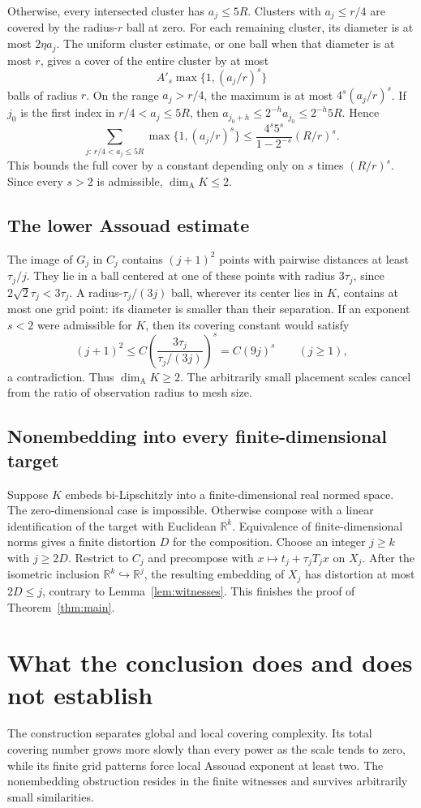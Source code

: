 \documentclass[11pt]{article}
\theoremstyle{remark}
\newcommand{\R}{\mathbb R}
\newcommand{\dimA}{\dim_{\mathrm A}}
\begin{document}
Otherwise, every intersected cluster has $a_j\le5R$. Clusters with $a_j\le r/4$ are covered by the radius-$r$ ball at zero. For each remaining cluster, its diameter is at most $2\eta a_j$. The uniform cluster estimate, or one ball when that diameter is at most $r$, gives a cover of the entire cluster by at most
\[
 A'_s\max\{1,(a_j/r)^s\}
\]
balls of radius $r$. On the range $a_j>r/4$, the maximum is at most $4^s(a_j/r)^s$. If $j_0$ is the first index in $r/4<a_j\le5R$, then $a_{j_0+h}\le2^{-h}a_{j_0}\le2^{-h}5R$. Hence
\[
 \sum_{j:\,r/4<a_j\le5R}\max\{1,(a_j/r)^s\}
 \le\frac{4^s5^s}{1-2^{-s}}(R/r)^s.
\]
This bounds the full cover by a constant depending only on $s$ times $(R/r)^s$. Since every $s>2$ is admissible, $\dimA K\le2$.

\subsection{The lower Assouad estimate}
The image of $G_j$ in $C_j$ contains $(j+1)^2$ points with pairwise distances at least $\tau_j/j$. They lie in a ball centered at one of these points with radius $3\tau_j$, since $2\sqrt2\tau_j<3\tau_j$. A radius-$\tau_j/(3j)$ ball, wherever its center lies in $K$, contains at most one grid point: its diameter is smaller than their separation. If an exponent $s<2$ were admissible for $K$, then its covering constant would satisfy
\[
 (j+1)^2\le C\left(\frac{3\tau_j}{\tau_j/(3j)}\right)^s
 =C(9j)^s\qquad(j\ge1),
\]
a contradiction. Thus $\dimA K\ge2$. The arbitrarily small placement scales cancel from the ratio of observation radius to mesh size.

\subsection{Nonembedding into every finite-dimensional target}
Suppose $K$ embeds bi-Lipschitzly into a finite-dimensional real normed space. The zero-dimensional case is impossible. Otherwise compose with a linear identification of the target with Euclidean $\R^k$. Equivalence of finite-dimensional norms gives a finite distortion $D$ for the composition. Choose an integer $j\ge k$ with $j\ge2D$. Restrict to $C_j$ and precompose with $x\mapsto t_j+\tau_jT_jx$ on $X_j$. After the isometric inclusion $\R^k\hookrightarrow\R^j$, the resulting embedding of $X_j$ has distortion at most $2D\le j$, contrary to Lemma~\ref{lem:witnesses}. This finishes the proof of Theorem~\ref{thm:main}.

\section{What the conclusion does and does not establish}
The construction separates global and local covering complexity. Its total covering number grows more slowly than every power as the scale tends to zero, while its finite grid patterns force local Assouad exponent at least two. The nonembedding obstruction resides in the finite witnesses and survives arbitrarily small similarities.
\end{document}
